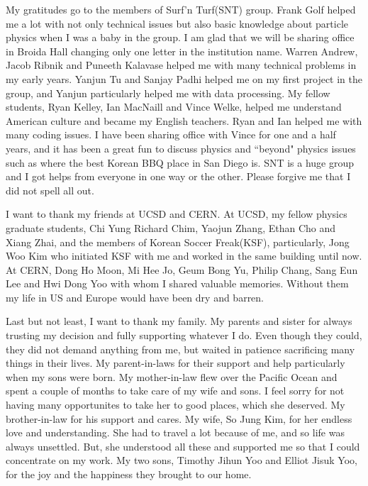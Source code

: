 \begin{frontmatter}
\begin{acknowledgements}
 My gratitudes go to the members of Surf'n Turf(SNT) group. Frank Golf helped me a lot 
 with not only technical issues but also basic knowledge about particle physics 
 when I was a baby in the group. I am glad that we will be sharing office in Broida Hall 
 changing only one letter in the institution name. Warren Andrew, Jacob Ribnik and Puneeth Kalavase
 helped me with many technical problems in my early years. Yanjun Tu and Sanjay Padhi helped me 
 on my first project in the group, and Yanjun particularly helped me with data processing. 
 My fellow students, Ryan Kelley, Ian MacNaill and Vince Welke, 
 helped me understand American culture and became my English teachers. Ryan and Ian helped 
 me with many coding issues. I have been 
 sharing office with Vince for one and a half years, and it has been a great fun to discuss 
 physics and ``beyond" physics issues such as where the best Korean BBQ place in San Diego is.  
 SNT is a huge group and I got helps from everyone in one way or the other. Please 
 forgive me that I did not spell all out. 

 I want to thank my friends at UCSD and CERN. At UCSD, my fellow physics graduate students,
 Chi Yung Richard Chim, Yaojun Zhang, Ethan Cho and Xiang Zhai, and the members 
 of Korean Soccer Freak(KSF), particularly, Jong Woo Kim who initiated KSF with me 
 and worked in the same building until now. 
 At CERN, Dong Ho Moon, Mi Hee Jo, Geum Bong Yu, Philip Chang, Sang Eun Lee and Hwi Dong Yoo
 with whom I shared valuable memories. Without them my life in US and Europe would have been 
 dry and barren. 

 Last but not least, I want to thank my family. My parents and sister for always trusting 
 my decision and fully supporting whatever I do. Even though they could, they did not 
 demand anything from me, but waited in patience sacrificing many things in their lives. 
 My parent-in-laws for their support and help particularly when my sons were born. 
 My mother-in-law flew over the Pacific Ocean and spent a couple of months to take care 
 of my wife and sons. I feel sorry for not having many opportunites to take her to 
 good places, which she deserved. My brother-in-law for his support and cares. 
 My wife, So Jung Kim, for her endless love and understanding. She had to travel a lot because of 
 me, and so life was always unsettled. But, she understood all these and supported me 
 so that I could concentrate on my work. My two sons, Timothy Jihun Yoo and Elliot Jisuk Yoo, 
 for the joy and the happiness they brought to our home. 
 \\ 


\end{acknowledgements}
\end{frontmatter}
